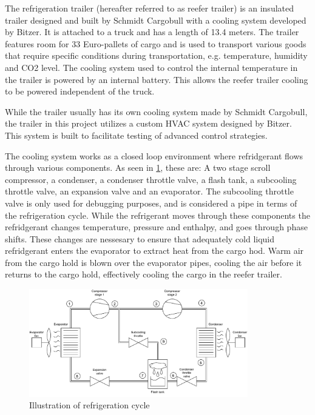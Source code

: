 The refrigeration trailer (hereafter referred to as reefer trailer) is an insulated trailer designed and built by Schmidt Cargobull with a cooling system developed by Bitzer. It is attached to a truck and has a length of 13.4 meters. The trailer features room for 33 Euro-pallets of cargo and is used to transport various goods that require specific  conditions during transportation, e.g. temperature, humidity and CO2 level. The cooling system used to control the internal temperature in the trailer is powered by an internal battery. This allows the reefer trailer cooling to be powered independent of the truck.

While the trailer usually has its own cooling system made by Schmidt Cargobull, the trailer in this project utilizes a custom HVAC system designed by Bitzer. This system is built to facilitate testing of advanced control strategies.

The cooling system works as a closed loop environment where refridgerant flows through various components. As seen in \cref{fig:HVAC_Diagram}, these are: A two stage scroll compressor, a condenser, a condenser throttle valve, a flash tank, a subcooling throttle valve, an expansion valve and an evaporator. The subcooling throttle valve is only used for debugging purposes, and is considered a pipe in terms of the refrigeration cycle.
While the refrigerant moves through these components the refridgerant changes temperature, pressure and enthalpy, and goes through phase shifts. These changes are nessesary to ensure that adequately cold liquid refridgerant enters the evaporator to extract heat from the cargo hod. Warm air from the cargo hold is blown over the evaporator pipes, cooling the air before it returns to the cargo hold, effectively cooling the cargo in the reefer trailer. 


\begin{figure}[h!]
	\centering
	\includegraphics[width=0.85\textwidth]{Graphics/HVAC_Diagram_Fans.pdf}
	\caption{Illustration of refrigeration cycle}
	\label{fig:HVAC_Diagram}
\end{figure}


